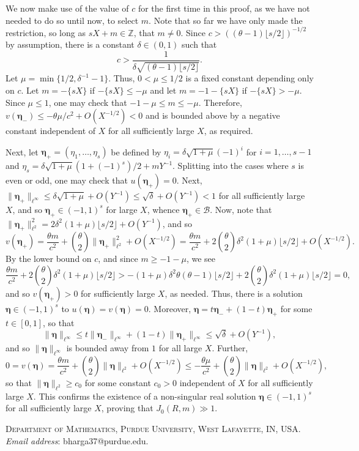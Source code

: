 \documentclass[11pt,reqno]{amsart}
\numberwithin{equation}{section}
\begin{document}
We now make use of the value of $c$ for the first time in this proof, as we have not needed to do so until now, to select $m$. Note that so far we have only made the restriction, so long as $sX+m \in \mathbb{Z}$, that $m \neq 0$. Since $c > ((\theta-1)\lfloor s/2\rfloor)^{-1/2}$ by assumption, there is a constant $\delta \in (0,1)$ such that 
\[ c > \frac{1}{\delta\sqrt{ (\theta-1)\lfloor s/2 \rfloor}}. \]
Let $\mu = \min\{1/2,\delta^{-1}-1\}$. Thus, $0 < \mu \leq 1/2$ is a fixed constant depending only on $c$. Let $m = -\{sX\} $ if $-\{sX\} \leq -\mu$ and let $m = -1-\{sX\}$ if $-\{sX\} > -\mu$. Since $\mu \leq 1$, one may check that $-1-\mu \leq m \leq -\mu$. 
Therefore, $v(\boldsymbol{\eta_-}) \leq -\theta \mu/c^2 + O(X^{-1/2}) < 0 $ and is bounded above by a negative constant independent of $X$ for all sufficiently large $X$, as required. 

Next, let $ \boldsymbol{\eta_+} = (\eta_1,\ldots,\eta_s) $ be defined by $\eta_i = \delta\sqrt{1+\mu}(-1)^{i}$ for $i = 1,\ldots,s-1$ and $\eta_s = \delta\sqrt{1+\mu}(1+(-1)^s)/2+mY^{-1}$. Splitting into the cases where $s$ is even or odd, one may check that $u(\boldsymbol{\eta_+}) = 0 $. Next, $\| \boldsymbol{\eta_+}\|_{\ell^{\infty}} \leq \delta\sqrt{1+\mu}+O(Y^{-1}) \leq \sqrt{\delta}+O(Y^{-1}) < 1$ for all sufficiently large $X$, and so $\boldsymbol{\eta_+} \in (-1,1)^s$ for large $X$, whence $\boldsymbol{\eta_+} \in \mathcal{B}$. Now, note that $\| \boldsymbol{\eta_+} \|_{\ell^2}^2 = 2\delta^2(1+\mu)\lfloor s/2 \rfloor+O(Y^{-1})$, and so 
\[ v(\boldsymbol{\eta_+}) = \frac{\theta m }{c^2}+\binom{\theta}{2}\| \boldsymbol{\eta_+}\|_{\ell^2}^2+O(X^{-1/2}) = \frac{\theta m }{c^2}+2\binom{\theta}{2}\delta^2(1+\mu)\lfloor s/2 \rfloor+O(X^{-1/2}). \]
By the lower bound on $c$, and since $m \geq -1-\mu$, we see 
\[ \frac{\theta m}{c^2}+2\binom{\theta}{2}\delta^2(1+\mu)\lfloor s/2 \rfloor > -(1+\mu)\delta^2\theta(\theta-1)\lfloor s/2 \rfloor +2\binom{\theta}{2}\delta^2(1+\mu)\lfloor s/2\rfloor = 0, \]
and so $v(\boldsymbol{\eta_+}) > 0$ for sufficiently large $X$, as needed. Thus, there is a solution $\boldsymbol{\eta} \in (-1,1)^{s}$ to $u(\boldsymbol{\eta})=v(\boldsymbol{\eta}) = 0$. Moreover, $\boldsymbol{\eta} = t\boldsymbol{\eta_-}+(1-t)\boldsymbol{\eta_+}$ for some $t \in [0,1]$, so that 
\[ \|\boldsymbol{\eta} \|_{\ell^{\infty}} \leq t\| \boldsymbol{\eta_-}\|_{\ell^{\infty}}+(1-t)\| \boldsymbol{\eta_+} \|_{\ell^{\infty}} \leq \sqrt{\delta} +O(Y^{-1}), \] 
and so $\|\boldsymbol{\eta} \|_{\ell^{\infty}}$ is bounded away from $1$ for all large $X$. 
Further, 
\[ 0 = v(\boldsymbol{\eta}) = \frac{\theta m}{c^2} +\binom{\theta}{2}\| \boldsymbol{\eta} \|_{\ell^{2}} +O(X^{-1/2}) \leq -\frac{\theta \mu}{c^2} +\binom{\theta}{2}\| \boldsymbol{\eta} \|_{\ell^{2}} +O(X^{-1/2}), \]
so that $\| \boldsymbol{\eta} \|_{\ell^{2}} \geq c_0$ for some constant $c_0 > 0$ independent of $X$ for all sufficiently large $X$. This confirms the existence of a non-singular real solution $\boldsymbol{\eta} \in (-1,1)^s $  for all sufficiently large $X$, proving that $J_0(R,m) \gg 1$. 


 

\noindent\textsc{Department of Mathematics, Purdue University, West Lafayette, IN, USA.}
\vspace{.03in}
\newline\noindent\textit{Email address}: bharga37@purdue.edu.
\end{document}
